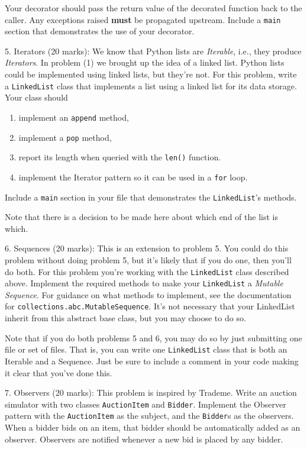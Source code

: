 \documentclass{article}
\begin{document}
Your decorator should pass the return value of the decorated function back to the caller. Any exceptions raised \textbf{must} be propagated upstream. Include a \texttt{main} section that demonstrates the use of your decorator.

\vspace{3mm}    
5. Iterators (20 marks): We know that Python lists are \emph{Iterable}, i.e., they produce \emph{Iterators}. In problem (1) we brought up the idea of a linked list. Python lists could be implemented using linked lists, but they're not. For this problem, write a \texttt{LinkedList} class that implements a list using a linked list for its data storage. Your class should 
  \begin{enumerate}
      \item implement an \texttt{append} method,
      \item implement a \texttt{pop} method,
      \item report its length when queried with the \texttt{len()} function.
      \item implement the Iterator pattern so it can be used in a \texttt{for} loop.
  \end{enumerate}
  
  Include a \texttt{main} section in your file that demonstrates the \texttt{LinkedList}'s methods. 
  
  Note that there is a decision to be made here about which end of the list is which.
  
6. Sequences (20 marks): This is an extension to problem 5. You could do this problem without doing problem 5, but it's likely that if you do one, then you'll do both. For this problem you're working with the \texttt{LinkedList} class described above. Implement the required methods to make your \texttt{LinkedList} a \emph{Mutable Sequence}. For guidance on what methods to implement, see the documentation for \texttt{collections.abc.MutableSequence}. It's not necessary that your LinkedList inherit from this abstract base class, but you may choose to do so.

Note that if you do both problems 5 and 6, you may do so by just submitting one file or set of files. That is, you can write one \texttt{LinkedList} class that is both an Iterable and a Sequence.  Just be sure to include a comment in your code making it clear that you've done this.      

\vspace{3mm}  
7. Observers (20 marks): This problem is inspired by Trademe. Write an auction simulator with two classes \texttt{AuctionItem} and \texttt{Bidder}. Implement the Observer pattern with the \texttt{AuctionItem} as the subject, and the \texttt{Bidder}s as the observers. When a bidder bids on an item, that bidder should be automatically added as an observer. Observers are notified whenever a new bid is placed by any bidder.
\end{document}

